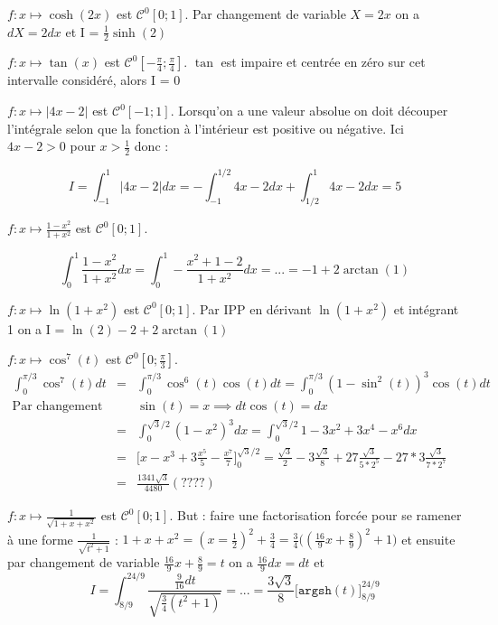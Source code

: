 \begin{Answer}
\Question $f:x\longmapsto \cosh(2x)$ est $\mathcal{C}^0[0;1]$. Par changement de variable $X = 2x$ on a $dX = 2dx$ et I = $\frac{1}{2} \sinh(2)$

\Question $f:x\longmapsto \tan(x)$ est $\mathcal{C}^0[-\frac{\pi}{4};\frac{\pi}{4}]$. $\tan$ est impaire et centrée en zéro sur cet intervalle considéré, alors I = 0

\Question $f:x\longmapsto |4x-2|$ est $\mathcal{C}^0[-1;1]$. Lorsqu'on a une valeur absolue on doit découper l'intégrale selon que la fonction à l'intérieur est positive ou négative. Ici $4x-2 > 0$ pour $ x> \frac{1}{2}$ donc :

$$I = \int_{-1}^{1} |4x-2| dx = - \int_{-1}^{1/2} 4x-2 dx + \int_{1/2}^{1} 4x-2 dx = 5 $$

\Question $f:x\longmapsto \frac{1-x^2}{1+x^2}$ est $\mathcal{C}^0[0;1]$.

$$\int_{0}^{1} \frac{1-x^2}{1+x^2} dx = \int_{0}^{1} - \frac{x^2 + 1 - 2}{1+x^2} dx = ... = -1 + 2 \arctan(1)$$

\Question $f:x\longmapsto \ln(1+x^2)$ est $\mathcal{C}^0[0;1]$. Par IPP en dérivant $\ln(1+x^2)$ et intégrant 1 on a I = $\ln(2)-2+2\arctan(1)$

\Question $f:x\longmapsto \cos^7(t)$ est $\mathcal{C}^0[0;\frac{\pi}{3}]$.
\begin{eqnarray}
\int_{0}^{\pi/3} \cos^7(t)dt & = & \int_0^{\pi/3} \cos^6(t)\cos(t)dt =  \int_0^{\pi/3} (1-\sin^2(t))^3 \cos(t) dt \nonumber \\
\text{Par changement de variable} & & \sin(t) = x \implies dt \cos(t) = dx \nonumber\\
 & = & \int_0^{\sqrt{3}/2} (1-x^2)^3 dx = \int_0^{\sqrt{3}/2} 1 - 3x^2 + 3x^4 - x^6 dx \nonumber \\
 & = & \Big[x - x^3 + 3\frac{x^5}{5} - \frac{x^7}{7} \Big]_0^{\sqrt{3}/2} = \frac{\sqrt{3}}{2} - 3 \frac{\sqrt{3}}{8} + 27 \frac{\sqrt{3}}{5 * 2^5} - 27*3 \frac{\sqrt{3}}{7 * 2^7} \nonumber \\
 & = & \frac{1341 \sqrt{3}}{4480} (????) \nonumber
\end{eqnarray}

\Question $f:x\longmapsto \frac{1}{\sqrt{1 + x + x^2}}$ est $\mathcal{C}^0[0;1]$. But : faire une factorisation forcée pour se ramener à une forme $\frac{1}{\sqrt{t^2 + 1}}$ : 
$1 + x + x^2 = (x = \frac{1}{2})^2 + \frac{3}{4} = \frac{3}{4}\Big((\frac{16}{9}x + \frac{8}{9})^2 + 1 \Big)$ et ensuite par changement de variable $\frac{16}{9} x + \frac{8}{9} = t$  on a  $\frac{16}{9} dx = dt$  et $$I = \int_{8/9}^{24/9} \frac{\frac{9}{16} dt}{\sqrt{\frac{3}{4} (t^2 +1)}} = ... = \frac{3\sqrt{3}}{8}\Big[\mathtt{argsh}(t)\Big]_{8/9}^{24/9}$$

\end{Answer}


\newpage

\shipoutAnswer %


